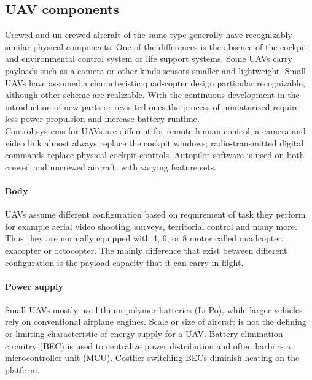 \subsection{UAV components}
\label{ssec:components}
%
Crewed and un-crewed aircraft of the same type generally have recognizably
similar physical components. One of the differences is the absence of the
cockpit and environmental control system or life support systems. Some UAVs
carry payloads such as a camera or other kinds sensors smaller and lightweight.
Small UAVs have assumed a characteristic quad-copter design particular
recognizable, although other scheme are realizable.
With the continuous development in the introduction of new parts or revisited 
ones the process of miniaturized require less-power propulsion and increase
battery runtime.\\
Control systems for UAVs are different for remote human control, a camera and
video link almost always replace the cockpit windows; radio-transmitted digital
commands replace physical cockpit controls. Autopilot software is used on both
crewed and uncrewed aircraft, with varying feature sets.\cite{wiki:uav}
%
%
\begin{figure}[htb]
    \centering
     \quad
    \label{fig:uav-design}
\end{figure}
%
%
\paragraph{Body} UAVs assume different configuration based on requirement of
task they perform for example aerial video shooting, surveys, territorial
control and many more.
Thus they are normally equipped with 4, 6, or 8 motor called quadcopter,
exacopter or octocopter.
The mainly difference that exist between different configuration is the payload
capacity that it can carry in flight.
%
\paragraph{Power supply}
Small UAVs mostly use lithium-polymer batteries (Li-Po), while larger vehicles
rely on conventional airplane engines. Scale or size of aircraft is not the
defining or limiting characteristic of energy supply for a UAV. 
Battery elimination circuitry (BEC) is used to centralize power distribution and
often harbors a microcontroller unit (MCU). Costlier switching BECs diminish
heating on the platform.\cite{wiki:uav}
%
